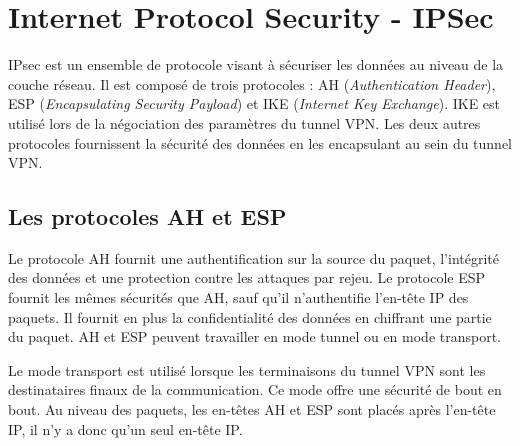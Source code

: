 \section{Internet Protocol Security - IPSec}
IPsec est un ensemble de protocole visant à sécuriser les données au niveau de la couche réseau. 
Il est composé de trois protocoles : AH (\textit{Authentication Header}), ESP (\textit{Encapsulating Security Payload}) et IKE (\textit{Internet Key Exchange}).
IKE est utilisé lors de la négociation des paramètres du tunnel VPN. 
Les deux autres protocoles fournissent la sécurité des données en les encapsulant au sein du tunnel VPN. 

\subsection{Les protocoles AH et ESP}
Le protocole AH fournit une authentification sur la source du paquet, l'intégrité des données et une protection contre les attaques par rejeu. 
Le protocole ESP fournit les mêmes sécurités que AH, sauf qu'il n'authentifie l'en-tête IP des paquets. 
Il fournit en plus la confidentialité des données en chiffrant une partie du paquet. 
AH et ESP peuvent travailler en mode tunnel ou en mode transport. 

Le mode transport est utilisé lorsque les terminaisons du tunnel VPN sont les destinataires finaux de la communication. 
Ce mode offre une sécurité de bout en bout. 
Au niveau des paquets, les en-têtes AH et ESP sont placés après l'en-tête IP, il n'y a donc qu'un seul en-tête IP.

